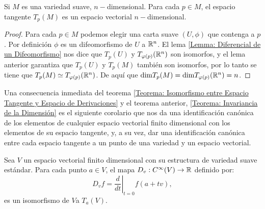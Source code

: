 \begin{theorem}\label{Teorema: Invariancia de la Dimensión}
	Si $M$ es una variedad suave, $n-$dimensional. Para cada $p \in M$, el espacio tangente $T_p(M)$ es un espacio vectorial $n-$dimensional.
\end{theorem}

\begin{proof}
	Para cada $p \in M$ podemos elegir una carta suave $(U, \phi)$ que contenga a $p$. Por definición $\phi$ es un difeomorfismo de $U$ a $\mathbb{R}^n$. El lema \ref{Lemma: Diferencial de un Difeomorfismo} nos dice que $T_{p}(U)$ y $T_{\varphi(p)}(\mathbb{R}^n)$ son isomorfos, y el lema anterior garantiza que $T_{p}(U)$ y $T_{p}(M)$ también son isomorfos, por lo tanto se tiene que $T_{p}(M) \simeq T_{\varphi(p)}(\mathbb{R}^n)$. De aquí que $\mathrm{dim} T_p(M) = \mathrm{dim} T_{\varphi(p)}(\mathbb{R}^n) = n$.
\end{proof}

Una consecuencia inmediata del teorema \ref{Teorema: Isomorfismo entre Espacio Tangente y Espacio de Derivaciones} y el teorema anterior, \ref{Teorema: Invariancia de la Dimensión} es el siguiente corolario que nos da una identificación canónica de los elementos de cualquier espacio vectorial finito dimensional con los elementos de su espacio tangente, y, a su vez, dar una identificación canónica entre cada espacio tangente a un punto de una variedad y un espacio vectorial.

\begin{corollary}
	Sea $V$ un espacio vectorial finito dimensional con su estructura de variedad suave estándar. Para cada punto $a \in V$, el mapa $D_v: C^{\infty}(V) \to \mathbb{R}$ definido por:
	\[D_vf = \left. \frac{d}{dt} \right|_{t=0} f(a+tv), \]
	es un isomorfismo de $V$a $T_a(V)$.
\end{corollary}
